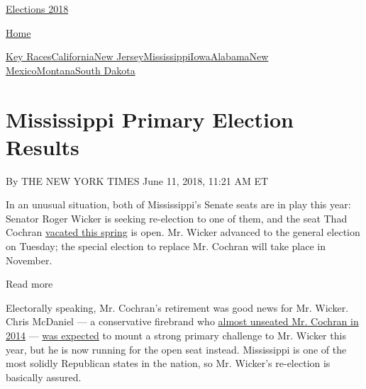\href{//www.nytimes3xbfgragh.onion}{}\href{https://www.nytimes3xbfgragh.onion/interactive/2018/us/elections/calendar-primary-results.html}{
Elections 2018}

\href{//www.nytimes3xbfgragh.onion}{ Home}

\href{https://www.nytimes3xbfgragh.onion/interactive/2018/06/05/us/elections/results-california-new-jersey-iowa-primaries.html}{Key
Races}\href{https://www.nytimes3xbfgragh.onion/interactive/2018/06/05/us/elections/results-california-primary-elections.html}{California}\href{https://www.nytimes3xbfgragh.onion/interactive/2018/06/05/us/elections/results-new-jersey-primary-elections.html}{New
Jersey}\href{https://www.nytimes3xbfgragh.onion/interactive/2018/06/05/us/elections/results-mississippi-primary-elections.html}{Mississippi}\href{https://www.nytimes3xbfgragh.onion/interactive/2018/06/05/us/elections/results-iowa-primary-elections.html}{Iowa}\href{https://www.nytimes3xbfgragh.onion/interactive/2018/06/05/us/elections/results-alabama-primary-elections.html}{Alabama}\href{https://www.nytimes3xbfgragh.onion/interactive/2018/06/05/us/elections/results-new-mexico-primary-elections.html}{New
Mexico}\href{https://www.nytimes3xbfgragh.onion/interactive/2018/06/05/us/elections/results-montana-primary-elections.html}{Montana}\href{https://www.nytimes3xbfgragh.onion/interactive/2018/06/05/us/elections/results-south-dakota-primary-elections.html}{South
Dakota}

\hypertarget{mississippi-primary-election-results}{%
\section{Mississippi Primary Election
Results}\label{mississippi-primary-election-results}}

By THE NEW YORK TIMES June 11, 2018, 11:21 AM ET

In an unusual situation, both of Mississippi's Senate seats are in play
this year: Senator Roger Wicker is seeking re-election to one of them,
and the seat Thad Cochran
\href{https://www.nytimes3xbfgragh.onion/2018/03/05/us/politics/thad-cochran-retire-senate.html}{vacated
this spring} is open. Mr. Wicker advanced to the general election on
Tuesday; the special election to replace Mr. Cochran will take place in
November.

Read more

Electorally speaking, Mr. Cochran's retirement was good news for Mr.
Wicker. Chris McDaniel --- a conservative firebrand who
\href{https://www.nytimes3xbfgragh.onion/2014/06/25/us/politics/thad-cochran-chris-mcdaniel-mississippi-senate-primary.html}{almost
unseated Mr. Cochran in 2014} ---
\href{https://www.nytimes3xbfgragh.onion/2018/02/26/us/politics/mississippi-mcdaniel-wicker-primary-fight.html}{was
expected} to mount a strong primary challenge to Mr. Wicker this year,
but he is now running for the open seat instead. Mississippi is one of
the most solidly Republican states in the nation, so Mr. Wicker's
re-election is basically assured.

